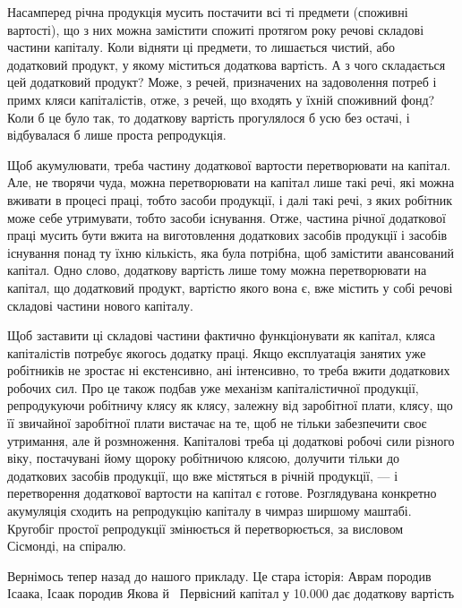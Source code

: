 
Насамперед річна продукція мусить постачити всі ті предмети
(споживні вартості), що з них можна замістити спожиті
протягом року речові складові частини капіталу. Коли відняти
ці предмети, то лишається чистий, або додатковий продукт, у
якому міститься додаткова вартість. А з чого складається цей
додатковий продукт? Може, з речей, призначених на задоволення
потреб і примх кляси капіталістів, отже, з речей, що входять
у їхній споживний фонд? Коли б це було так, то додаткову
вартість прогулялося б усю без остачі, і відбувалася б лише
проста репродукція.

Щоб акумулювати, треба частину додаткової вартости перетворювати
на капітал. Але, не творячи чуда, можна перетворювати
на капітал лише такі речі, які можна вживати в процесі
праці, тобто засоби продукції, і далі такі речі, з яких робітник
може себе утримувати, тобто засоби існування. Отже, частина
річної додаткової праці мусить бути вжита на виготовлення додаткових
засобів продукції і засобів існування понад ту їхню
кількість, яка була потрібна, щоб замістити авансований капітал.
Одно слово, додаткову вартість лише тому можна перетворювати
на капітал, що додатковий продукт, вартістю якого вона
є, вже містить у собі речові складові частини нового капіталу.

Щоб заставити ці складові частини фактично функціонувати
як капітал, кляса капіталістів потребує якогось додатку праці.
Якщо експлуатація занятих уже робітників не зростає ні екстенсивно,
ані інтенсивно, то треба вжити додаткових робочих сил.
Про це також подбав уже механізм капіталістичної продукції,
репродукуючи робітничу клясу як клясу, залежну від заробітної
плати, клясу, що її звичайної заробітної плати вистачає на
те, щоб не тільки забезпечити своє утримання, але й розмноження.
Капіталові треба ці додаткові робочі сили різного віку, постачувані
йому щороку робітничою клясою, долучити тільки до
додаткових засобів продукції, що вже містяться в річній продукції,
— і перетворення додаткової вартости на капітал є готове.
Розглядувана конкретно акумуляція сходить на репродукцію
капіталу в чимраз ширшому маштабі. Кругобіг простої репродукції
змінюється й перетворюється, за висловом Сісмонді, на
спіралю.

Вернімось тепер назад до нашого прикладу. Це стара історія:
Аврам породив Ісаака, Ісаак породив Якова й~ Первісний
капітал у \num{10.000} дає додаткову вартість
\parbreak{}  %
